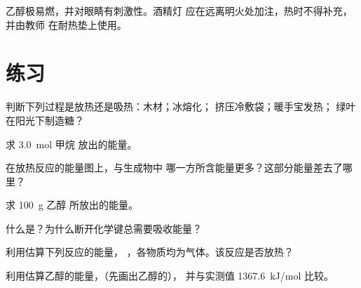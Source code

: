 \begin{safety}{}
乙醇极易燃，并对眼睛有刺激性。酒精灯
应在远离明火处加注，热时不得补充，并由教师
在耐热垫上使用。
\end{safety}

\section{练习}


\begin{exercise}[$\star$]\label{exo:g11:reaction-energy:1}
判断下列过程是放热还是吸热：木材；冰熔化；
挤压冷敷袋；暖手宝发热；
绿叶在阳光下制造糖？
\end{exercise}

\begin{exercise}[$\star$]\label{exo:g11:reaction-energy:2}
求 \qty{3.0}{mol} 甲烷
放出的能量。
\end{exercise}

\begin{exercise}[$\star$]\label{exo:g11:reaction-energy:3}
在放热反应的能量图上，与生成物中
哪一方所含能量更多？这部分能量差去了哪里？
\end{exercise}

\begin{exercise}[$\star$]\label{exo:g11:reaction-energy:4}
求 \qty{100}{g} 乙醇
所放出的能量。
\end{exercise}

\begin{exercise}[$\star$]\label{exo:g11:reaction-energy:5}
什么是？为什么断开化学键总需要吸收能量？
\end{exercise}

\begin{exercise}[$\star\star$]\label{exo:g11:reaction-energy:6}
利用估算下列反应的能量，
，各物质均为气体。该反应是否放热？
\end{exercise}

\begin{exercise}[$\star\star$]\label{exo:g11:reaction-energy:7}
利用估算乙醇的能量，（先画出乙醇的），
并与实测值 \qty{1367.6}{kJ/mol} 比较。
\end{exercise}

